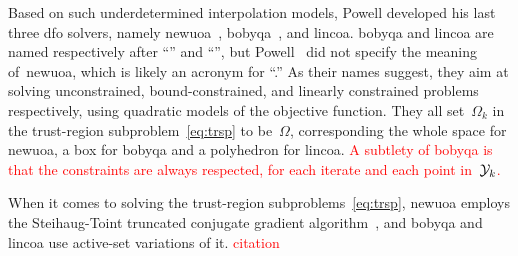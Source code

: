 \documentclass[
    smallextended,  %
    draft,          %
]{svjour3}
\newcommand{\fsetm}[1][k]{\Omega_{#1}}
\newcommand{\fset}{\Omega}
\newcommand{\xpt}[1][k]{\mathcal{Y}\ifthenelse{\equal{#1}{}}{}{_{#1}}}
\newcommand{\red}{\textcolor{red}}
\begin{document}
Based on such underdetermined interpolation models, Powell developed his last three \gls{dfo} solvers, namely \gls{newuoa}~\cite{Powell_2006,Powell_2008}, \gls{bobyqa}~\cite{Powell_2009}, and \gls{lincoa}.
\Gls{bobyqa} and \gls{lincoa} are named respectively after ``'' and
``'', but Powell~\cite{Powell_2006,Powell_2008} did not specify the meaning of~\gls{newuoa}, which is likely an acronym for ``.''
As their names suggest, they aim at solving unconstrained, bound-constrained, and linearly constrained problems respectively, using quadratic models of the objective function.
They all set~$\fsetm$ in the trust-region subproblem~\eqref{eq:trsp} to be~$\fset$, corresponding the whole space for \gls{newuoa}, a box for \gls{bobyqa} and a polyhedron for \gls{lincoa}.
\red{A subtlety of \gls{bobyqa} is that the constraints are always respected, for each iterate and
each point in~$\xpt$.}

When it comes to solving the trust-region subproblems~\eqref{eq:trsp}, \gls{newuoa} employs the
Steihaug-Toint truncated conjugate gradient algorithm~\cite{Steihaug_1983,Toint_1981}, and
\gls{bobyqa} and \gls{lincoa} use active-set variations of it. \red{citation}
\end{document}
